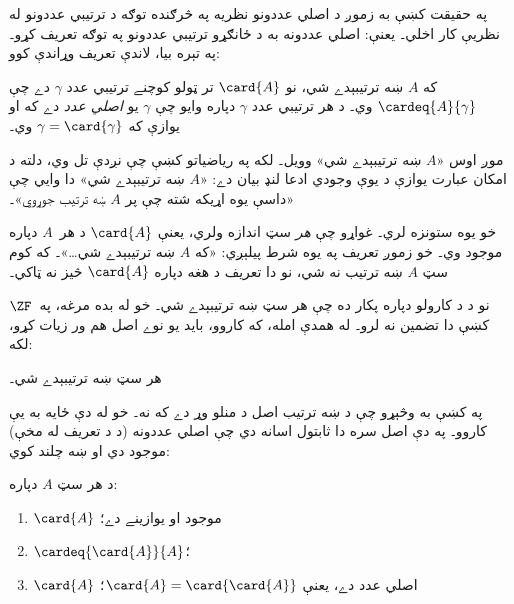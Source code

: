 \documentclass[../../../include/open-logic-section]{subfiles}
\begin{document}

په حقيقت کښې به زموږ د اصلي عددونو نظريه په څرګنده توګه د ترتيبي
عددونو له نظريې کار اخلي۔ يعنې: اصلي عددونه به د ځانګړو ترتيبي
عددونو په توګه تعريف کړو۔ په تېره بيا، لاندې تعريف وړاندې کوو:

\begin{defn}
که $A$ ښه ترتيبېدے شي، نو $\card{A}$ تر ټولو کوچنے ترتيبي عدد
$\gamma$ دے چې $\cardeq{A}{\gamma}$ وي۔ د هر ترتيبي عدد $\gamma$
دپاره وايو چې $\gamma$ يو \emph{اصلي عدد} دے که او يوازې که
$\gamma = \card{\gamma}$ وي۔
\end{defn}

موږ اوس «$A$ ښه ترتيبېدے شي» وويل۔ لکه په رياضياتو کښې چې نږدې
تل وي، دلته د امکان عبارت يوازې د يوې وجودي ادعا لنډ بيان دے:
«$A$ ښه ترتيبېدے شي» دا وايي چې «داسې يوه اړيکه شته چې پر
$A$ ښه ترتيب جوړوي»۔

خو  يوه ستونزه لري۔ غواړو چې \emph{هر}
سټ اندازه ولري، يعنې $\card{A}$ د هر~$A$ دپاره موجود وي۔ خو زموږ
تعريف په يوه شرط پيلېږي: «که $A$ ښه ترتيبېدے شي\ldots»۔ که
کوم سټ $A$ ښه ترتيب نه شي، نو دا تعريف د هغه دپاره $\card{A}$
څيز نه ټاکي۔

نو د  د کارولو دپاره پکار ده چې هر سټ
ښه ترتيبېدے شي۔ خو له بده مرغه، په~$\ZF$ کښې دا تضمين نه لرو۔
له همدې امله، که  کاروو، بايد يو نوے
اصل هم ور زيات کړو، لکه:
\begin{axiom}[ښه ترتيب]
هر سټ ښه ترتيبېدے شي۔
\end{axiom}
په  کښې به وڅېړو چې د ښه ترتيب اصل د منلو
وړ دے که نه۔ خو له دې ځايه به يې کاروو۔ په دې اصل سره دا ثابتول
اسانه دي چې اصلي عددونه (د  د تعريف
له مخې) موجود دي او ښه چلند کوي:

\begin{lem}
د هر سټ $A$ دپاره:
\begin{enumerate}
	\item{} $\card{A}$ موجود او يوازينے دے؛
	\item{}  $\cardeq{\card{A}}{A}$؛
	\item{}  $\card{A}$ اصلي عدد دے، يعنې
	$\card{A} = \card{\card{A}}$؛
\end{enumerate}
\end{lem}
\end{document}
